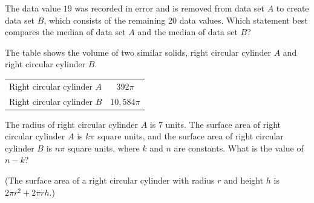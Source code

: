 The data value \(19\) was recorded in error and is removed from data set \(A\) to create data set \(B\), which consists of the remaining \(20\) data values.
Which statement best compares the median of data set \(A\) and the median of data set \(B\)?

\vspace{0.75em}


\vspace{2em}
\newpage

\noindent\markforreview
\vspace{1em}

The table shows the volume of two similar solids, right circular cylinder \(A\) and right circular cylinder \(B\).

\begin{center}
\begin{tabular}{|l|c|}
\hline
Right circular cylinder \(A\) & \(392\pi\) \\
Right circular cylinder \(B\) & \(10{,}584\pi\) \\
\hline
\end{tabular}
\end{center}

The radius of right circular cylinder \(A\) is \(7\) units.
The surface area of right circular cylinder \(A\) is \(k\pi\) square units, and the surface area of right circular cylinder \(B\) is \(n\pi\) square units, where \(k\) and \(n\) are constants.
What is the value of \(n - k\)?

(The surface area of a right circular cylinder with radius \(r\) and height \(h\) is \(2\pi r^{2} + 2\pi rh\).)

\vspace{0.75em}


\vspace{2em}
\newpage
